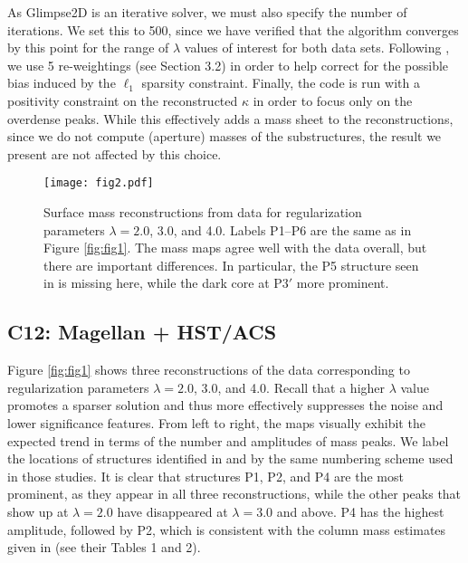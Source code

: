 \documentclass[iop,twocolappendix]{emulateapj}
\newcommand{\cta}[1]{\citetalias{#1}}
\begin{document}
As Glimpse2D is an iterative solver, we must also specify the 
number of iterations. We set this to 500, since we have verified that the algorithm
converges by this point for the range of $\lambda$ values of interest for both data sets.
Following \citet{LSL.etal.2016}, we use 5 re-weightings (see Section 3.2) in order to 
help correct for the possible bias induced by the $\ell_1$ sparsity constraint.
Finally, the code is run with a positivity constraint on the reconstructed $\kappa$ in order to 
focus only on the overdense peaks. While this effectively adds a mass sheet to the reconstructions,
since we do not compute (aperture) masses of the substructures, the result we present are not 
affected by this choice.

\begin{figure*}
\centering
\texttt{[image: fig2.pdf]}
\caption{Surface mass reconstructions from \cta{J14} data for regularization parameters $\lambda=2.0$, 
         3.0, and 4.0. Labels P1--P6 are the same as in Figure \ref{fig:fig1}. The mass maps agree well with
         the \cta{C12} data overall, but there are important differences. In particular, the P5 structure
         seen in \cta{C12} is missing here, while the dark core at P$3'$ more prominent.}
\label{fig:fig2}
\end{figure*}

\subsection{C12: Magellan + HST/ACS}\label{ssec:recs}
Figure \ref{fig:fig1} shows three reconstructions of the \cta{C12} data corresponding to 
regularization parameters $\lambda=2.0$, 3.0, and 4.0. Recall that a higher $\lambda$ value 
promotes a sparser solution and thus more effectively suppresses the noise and lower significance 
features. From left to right, the maps visually exhibit the expected trend in terms of the number 
and amplitudes of mass peaks. We label the locations of structures identified in \cta{C12} and 
\cta{J14} by the same numbering scheme used in those studies. It is clear that structures P1, P2, 
and P4 are the most prominent, as they appear in all three reconstructions, while the other peaks 
that show up at $\lambda=2.0$ have disappeared at $\lambda=3.0$ and above. P4 has the highest 
amplitude, followed by P2, which is consistent with the column mass estimates given in \cta{C12} 
(see their Tables 1 and 2). 
\end{document}
